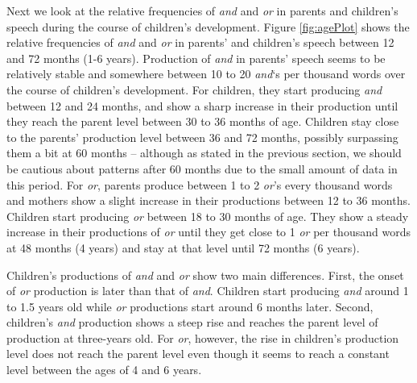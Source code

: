\documentclass[oneside]{report}
\theoremstyle{definition}
\theoremstyle{definition}
\theoremstyle{definition}
\theoremstyle{remark}
\begin{document}
Next we look at the relative frequencies of \emph{and} and \emph{or} in
parents and children's speech during the course of children's
development. Figure \ref{fig:agePlot} shows the relative frequencies of
\emph{and} and \emph{or} in parents' and children's speech between 12
and 72 months (1-6 years). Production of \emph{and} in parents' speech
seems to be relatively stable and somewhere between 10 to 20
\emph{and}`s per thousand words over the course of children's
development. For children, they start producing \emph{and} between 12
and 24 months, and show a sharp increase in their production until they
reach the parent level between 30 to 36 months of age. Children stay
close to the parents' production level between 36 and 72 months,
possibly surpassing them a bit at 60 months -- although as stated in the
previous section, we should be cautious about patterns after 60 months
due to the small amount of data in this period. For \emph{or}, parents
produce between 1 to 2 \emph{or}'s every thousand words and mothers show
a slight increase in their productions between 12 to 36 months. Children
start producing \emph{or} between 18 to 30 months of age. They show a
steady increase in their productions of \emph{or} until they get close
to 1 \emph{or} per thousand words at 48 months (4 years) and stay at
that level until 72 months (6 years).

Children's productions of \emph{and} and \emph{or} show two main
differences. First, the onset of \emph{or} production is later than that
of \emph{and}. Children start producing \emph{and} around 1 to 1.5 years
old while \emph{or} productions start around 6 months later. Second,
children's \emph{and} production shows a steep rise and reaches the
parent level of production at three-years old. For \emph{or}, however,
the rise in children's production level does not reach the parent level
even though it seems to reach a constant level between the ages of 4 and
6 years.
\end{document}
